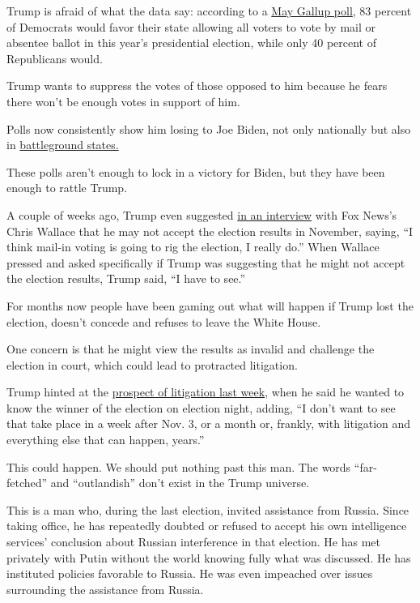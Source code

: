 Trump is afraid of what the data say: according to a
\href{https://news.gallup.com/poll/310586/americans-favor-voting-mail-option-november.aspx}{May
Gallup poll}, 83 percent of Democrats would favor their state allowing
all voters to vote by mail or absentee ballot in this year's
presidential election, while only 40 percent of Republicans would.

Trump wants to suppress the votes of those opposed to him because he
fears there won't be enough votes in support of him.

Polls now consistently show him losing to Joe Biden, not only nationally
but also in
\href{https://www.nytimes.com/2020/06/25/upshot/poll-2020-biden-battlegrounds.html}{battleground
states.}

These polls aren't enough to lock in a victory for Biden, but they have
been enough to rattle Trump.

A couple of weeks ago, Trump even suggested
\href{https://youtu.be/W6XdpDOH1JA?t=2243}{in an interview} with Fox
News's Chris Wallace that he may not accept the election results in
November, saying, ``I think mail-in voting is going to rig the election,
I really do.'' When Wallace pressed and asked specifically if Trump was
suggesting that he might not accept the election results, Trump said,
``I have to see.''

For months now people have been gaming out what will happen if Trump
lost the election, doesn't concede and refuses to leave the White House.

One concern is that he might view the results as invalid and challenge
the election in court, which could lead to protracted litigation.

Trump hinted at the
\href{https://thehill.com/regulation/court-battles/509907-experts-dismiss-trump-claim-that-it-could-take-years-to-declare}{prospect
of litigation last week}, when he said he wanted to know the winner of
the election on election night, adding, ``I don't want to see that take
place in a week after Nov. 3, or a month or, frankly, with litigation
and everything else that can happen, years.''

This could happen. We should put nothing past this man. The words
``far-fetched'' and ``outlandish'' don't exist in the Trump universe.

This is a man who, during the last election, invited assistance from
Russia. Since taking office, he has repeatedly doubted or refused to
accept his own intelligence services' conclusion about Russian
interference in that election. He has met privately with Putin without
the world knowing fully what was discussed. He has instituted policies
favorable to Russia. He was even impeached over issues surrounding the
assistance from Russia.

